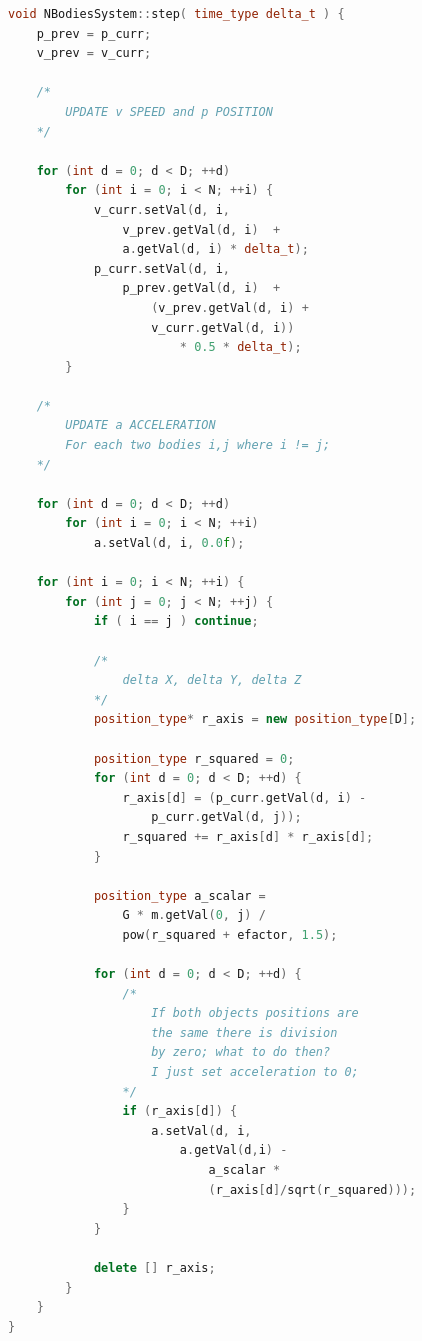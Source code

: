 \documentclass[fleqn]{article}
\begin{document}
\begin {lstlisting}[language=C++]
void NBodiesSystem::step( time_type delta_t ) {
    p_prev = p_curr;
    v_prev = v_curr;

    /*
        UPDATE v SPEED and p POSITION
    */

    for (int d = 0; d < D; ++d)
        for (int i = 0; i < N; ++i) {
            v_curr.setVal(d, i, 
                v_prev.getVal(d, i)  +  
                a.getVal(d, i) * delta_t);
            p_curr.setVal(d, i, 
                p_prev.getVal(d, i)  +  
                    (v_prev.getVal(d, i) + 
                    v_curr.getVal(d, i)) 
                        * 0.5 * delta_t);
        }
    
    /*
        UPDATE a ACCELERATION
        For each two bodies i,j where i != j;
    */

    for (int d = 0; d < D; ++d)
        for (int i = 0; i < N; ++i)
            a.setVal(d, i, 0.0f);

    for (int i = 0; i < N; ++i) {
        for (int j = 0; j < N; ++j) {
            if ( i == j ) continue;

            /*
                delta X, delta Y, delta Z   
            */
            position_type* r_axis = new position_type[D];
            
            position_type r_squared = 0;
            for (int d = 0; d < D; ++d) {
                r_axis[d] = (p_curr.getVal(d, i) - 
                    p_curr.getVal(d, j));
                r_squared += r_axis[d] * r_axis[d];
            }

            position_type a_scalar = 
                G * m.getVal(0, j) / 
                pow(r_squared + efactor, 1.5);

            for (int d = 0; d < D; ++d) {
                /*
                    If both objects positions are 
                    the same there is division 
                    by zero; what to do then?
                    I just set acceleration to 0;
                */
                if (r_axis[d]) {
                    a.setVal(d, i, 
                        a.getVal(d,i) - 
                            a_scalar * 
                            (r_axis[d]/sqrt(r_squared)));
                }   
            }

            delete [] r_axis;
        }
    }
} 
\end{lstlisting}
\end{document}
